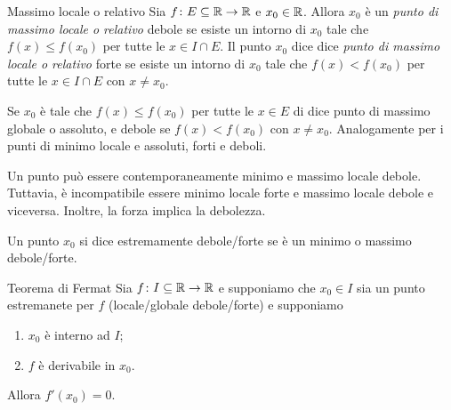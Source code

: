 \documentclass[a4paper]{article}
\begin{document}
\begin{snippetdefinition}{Massimo locale o relativo}
    Sia \(f\colon E \subseteq \mathbb{R} \to \mathbb{R}\)
    e \(x_0 \in \mathbb{R}\). Allora \(x_0\) è un \emph{punto di massimo
    locale o relativo} debole se esiste un intorno di \(x_0\)
    tale che \(f(x) \leq f(x_0)\) per tutte le \(x \in I \cap E\).
    Il punto \(x_0\) dice dice \emph{punto di massimo locale o relativo}
    forte se esiste un intorno di \(x_0\) tale che
    \(f(x) < f(x_0)\) per tutte le \(x \in I \cap E\) con \(x \neq x_0\).
\end{snippetdefinition}

Se \(x_0\) è tale che \(f(x) \leq f(x_0)\) per tutte le \(x\in E\) di dice
punto di massimo globale o assoluto, e debole se \(f(x) < f(x_0)\) con \(x\neq x_0\).
Analogamente per i punti di minimo locale e assoluti, forti e deboli.

Un punto può essere contemporaneamente minimo e massimo locale debole.
Tuttavia, è incompatibile essere minimo locale forte e massimo locale debole e viceversa.
Inoltre, la forza implica la debolezza.

\begin{snippetdefinition}{}
    Un punto \(x_0\) si dice estremamente debole/forte se è
    un minimo o massimo debole/forte.
\end{snippetdefinition}

\begin{snippettheorem}{Teorema di Fermat}
    Sia \(f\colon I \subseteq \mathbb{R} \to \mathbb{R}\)
    e supponiamo che \(x_0 \in I\) sia un punto estremanete per \(f\)
    (locale/globale debole/forte) e supponiamo
    \begin{enumerate}
        \item \(x_0\) è interno ad \(I\);
        \item \(f\) è derivabile in \(x_0\).
    \end{enumerate}
    Allora \(f'(x_0) = 0\).
\end{snippettheorem}
\end{document}

